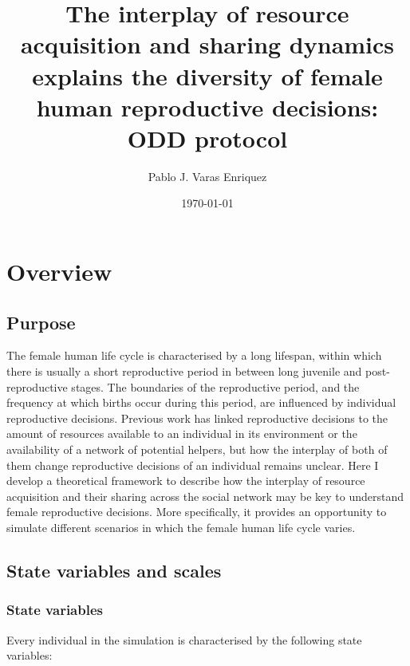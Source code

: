 \documentclass{article}
\title{The interplay of resource acquisition and sharing dynamics explains the diversity of female human reproductive decisions:
\\
ODD protocol}
\author{Pablo J. Varas Enriquez}
\date{\today}
\begin{document}
\maketitle

\tableofcontents

\section{Overview}

\subsection{Purpose}

The female human life cycle is characterised by a long lifespan, within which there is usually a short reproductive period in between long juvenile and post-reproductive stages. The boundaries of the reproductive period, and the frequency at which births occur during this period, are influenced by individual reproductive decisions. Previous work has linked reproductive decisions to the amount of resources available to an individual in its environment or the availability of a network of potential helpers, but how the interplay of both of them change reproductive decisions of an individual remains unclear. Here I develop a theoretical framework to describe how the interplay of resource acquisition and their sharing across the social network may be key to understand female reproductive decisions. More specifically, it provides an opportunity to simulate different scenarios in which the female human life cycle varies.

\subsection{State variables and scales}

\subsubsection{State variables}

Every individual in the simulation is characterised by the following state variables:
\end{document}
